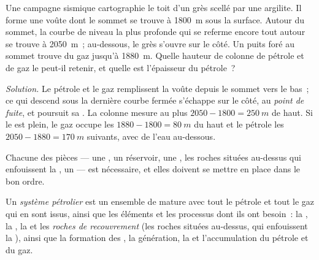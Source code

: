 \begin{example}\label{ex:g11:fossil-fuel-geology:anticline}
Une campagne sismique cartographie le toit d'un grès scellé par une
argilite. Il forme une voûte dont le sommet se trouve à \qty{1800}{m} sous
la surface. Autour du sommet, la courbe de niveau la plus profonde qui se
referme encore tout autour se trouve à \qty{2050}{m}~; au-dessous, le grès
s'ouvre sur le côté. Un puits foré au sommet trouve du gaz jusqu'à
\qty{1880}{m}. Quelle hauteur de colonne de pétrole et de gaz le 
peut-il retenir, et quelle est l'épaisseur du pétrole~?

\emph{Solution.} Le pétrole et le gaz remplissent la voûte depuis le sommet
vers le bas~; ce qui descend sous la dernière courbe fermée s'échappe sur
le côté, au \emph{point de fuite}, et poursuit sa . La colonne
mesure au plus $2050 - 1800 = \qty{250}{m}$ de haut. Si le  est
plein, le gaz occupe les $1880 - 1800 = \qty{80}{m}$ du haut et le pétrole
les $2050 - 1880 = \qty{170}{m}$ suivants, avec de l'eau au-dessous.
\end{example}

Chacune des pièces --- une , un réservoir, une , les
roches situées au-dessus qui enfouissent la , un  --- est
nécessaire, et elles doivent se mettre en place dans le bon ordre.

\begin{definition}\label{def:g11:fossil-fuel-geology:petroleum-system}
Un \emph{système pétrolier} est
un ensemble de  mature avec tout le pétrole et tout le gaz qui en
sont issus, ainsi que les éléments et les processus dont ils ont besoin~: la
, la , la  et les \emph{roches de
recouvrement} (les roches situées au-dessus,
qui enfouissent la ), ainsi que la formation des , la
génération, la  et l'accumulation du pétrole et du gaz.
\end{definition}

